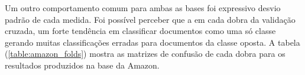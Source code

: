 \documentclass[template.tex]{subfiles}
\begin{document}

Um outro comportamento comum para ambas as bases foi expressivo desvio padrão de cada medida. Foi possível perceber que a em cada dobra da validação cruzada, um forte tendência em classificar documentos como uma só classe gerando muitas classificações erradas para documentos da classe oposta. A tabela (\ref{table:amazon_folds}) mostra as matrizes de confusão de cada dobra para os resultados produzidos na base da Amazon. 
\end{document}
